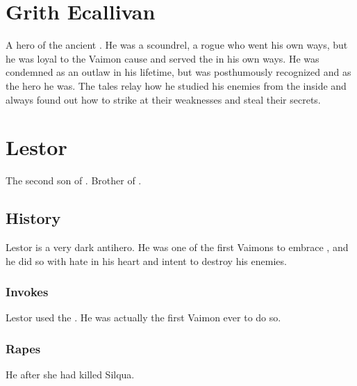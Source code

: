 \section{Grith Ecallivan}
A hero of the ancient . 
He was a scoundrel, a rogue who went his own ways, but he was loyal to the Vaimon cause and served the \caliphate in his own ways. 
He was condemned as an outlaw in his lifetime, but was posthumously recognized and \honoured as the hero he was. 
The tales relay how he studied his enemies from the inside and always found out how to strike at their weaknesses and steal their secrets. 















\section{Lestor \Delaen}
The second son of . 
Brother of . 









\subsection{History}
Lestor is a very dark antihero. 
He was one of the first Vaimons to embrace \Itzach, and he did so with hate in his heart and intent to destroy his enemies. 





\subsubsection{Invokes \qliphoth}
Lestor used the \qliphoth. 
He was actually the first Vaimon ever to do so. 





\subsubsection{Rapes \Delphine}
He  after she had killed Silqua. 





